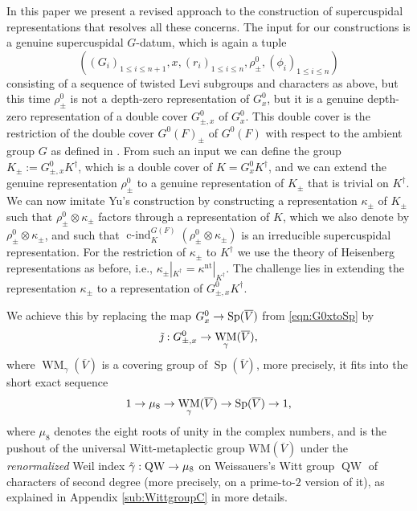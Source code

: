\documentclass{article}
\def\ol#1{\overline{#1}}
\DeclareMathOperator{\Sp}{Sp}
\DeclareMathOperator{\cind}{c-ind}
\theoremstyle{definition}
\numberwithin{equation}{subsection}
\renewcommand{\-}{\hyp{}}
\DeclareMathOperator{\WM}{WM}
\newcommand{\WMuniv}{\mathrm{WM}}
\DeclareMathOperator{\QW}{QW}
\begin{document}
In this paper we present a revised approach to the construction of supercuspidal representations that resolves all these concerns. The input for our constructions is a genuine supercuspidal $G$-datum, which is again a tuple 
\[((G_i)_{1\leq i\leq n+1},x,(r_i)_{1\leq i\leq n},\rho^0_{\pm},(\phi_i)_{1\leq i\leq n}) \]
consisting of a sequence of twisted Levi subgroups and characters as above, but this time $\rho^0_{\pm}$ is not a depth-zero representation of $G^0_x$, but it is a genuine depth-zero representation of a double cover $G^0_{\pm,x}$ of $G^0_x$. This double cover is the restriction of the double cover $G^0(F)_{\pm}$ of $G^0(F)$ with respect to the ambient group $G$ as defined in \cite[\S6]{KalDC}. From such an input we can define the group $K_{\pm}:=G^0_{\pm,x}K^\dagger$, which is a double cover of $K=G^0_{x}K^\dagger$, and we can extend the genuine representation $\rho^0_{\pm}$ to a genuine representation of $K_{\pm}$ that is trivial on $K^\dagger$. We can now imitate Yu's construction by constructing a representation $\kappa_{\pm}$ of $K_{\pm}$ such that $\rho^0_{\pm} \otimes \kappa_{\pm}$ factors through a representation of $K$, which we also denote by $\rho^0_{\pm} \otimes \kappa_{\pm}$, and such that $\cind_{K}^{G(F)}(\rho^0_{\pm} \otimes \kappa_{\pm})$ is an irreducible supercuspidal representation. For the restriction of $\kappa_{\pm}$ to $K^\dagger$ we use the theory of Heisenberg representations as before, i.e., $\kappa_{\pm}|_{K^\dagger}=\kappa^{\mathrm{nt}}|_{K^\dagger}$. The challenge lies in extending the representation $\kappa_{\pm}$ to a representation of $G^0_{\pm, x}K^\dagger$. 

We achieve this by replacing the map $ G^0_x \ra \Sp(\ol{V}) $ from \eqref{eqn:G0xtoSp} by
\begin{equation} \label{eqn:G0xtoWM} \tilde\jmath :  G^0_{\pm,x} \ra \WM_\gamma(\ol{V}) ,\end{equation}
where $\WM_\gamma(\ol{V})$ is a covering group of $\Sp(\ol{V})$, more precisely, it fits into the short exact sequence
\[ 1 \ra \mu_8 \ra \WM_\gamma(\ol{V}) \ra \Sp(\ol{V}) \ra 1, \]
where $\mu_8$ denotes the eight roots of unity in the complex numbers, and is the pushout of the universal Witt-metaplectic group $\WMuniv(\ol{V})$ under the \emph{renormalized} Weil index $\tilde\gamma:\QW \ra \mu_8$ on Weissauers's Witt group $\QW$ of characters of second degree (more precisely, on a prime-to-$2$ version of it), as explained in Appendix \ref{sub:WittgroupC} in more details.
\end{document}
